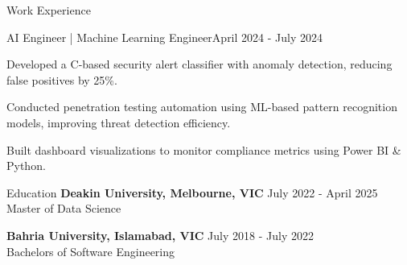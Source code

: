 \documentclass{resume} %
\begin{document}
    \begin{rSection}{Work Experience}
                    \begin{rSubsection}
                {AI Engineer | Machine Learning Engineer}{April 2024 - July 2024}
                                    {}
                                {}
                                    \item Developed a C{-}based security alert classifier with anomaly detection, reducing false positives by 25\%.
                                    \item Conducted penetration testing automation using ML{-}based pattern recognition models, improving threat detection efficiency.
                                    \item Built dashboard visualizations to monitor compliance metrics using Power BI \& Python.
                            \end{rSubsection}
            \end{rSection}

\begin{rSection}{Education}
                        \textbf{Deakin University, Melbourne, VIC} \hfill {July 2022 - April 2025} \\
                            {Master of Data Science}
                         
             
         
                        \textbf{Bahria University, Islamabad, VIC} \hfill {July 2018 - July 2022} \\
                            {Bachelors of Software Engineering}
                         
             
         
    \end{rSection}
\end{document}
